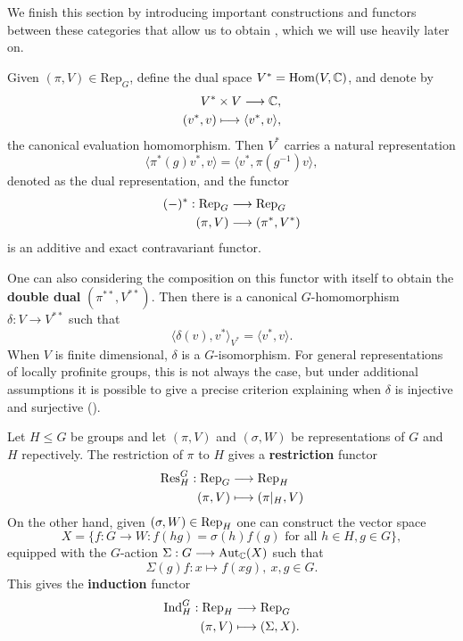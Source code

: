 We finish this section by introducing important constructions and functors between these categories that allow us to obtain , which we will use heavily later on.

\begin{defn}
    Given $(\pi,V)\in\mathrm{Rep}_G$, define the dual space $V^*=\mathrm{Hom}(V,\mathbb{C})$, and denote by 
    \begin{align*}
        V^*\times V\longrightarrow \mathbb{C},\\
        (v^*,v)\longmapsto\langle v^*,v\rangle,
    \end{align*}
    the canonical evaluation homomorphism. Then $V^*$ carries a natural representation 
    $$\langle\pi^*(g)v^*,v\rangle=\langle v^*,\pi(g^{-1})v\rangle,$$
    denoted as the dual representation, and the functor 
    \begin{align*}
        (-)^*:\mathrm{Rep}_G&\longrightarrow\mathrm{Rep}_G\\
        (\pi,V)&\longrightarrow(\pi^*,V^*)
    \end{align*}
    is an additive and exact contravariant functor.
\end{defn}

One can also considering the composition on this functor with itself to obtain the \textbf{double dual} $(\pi^{**},V^{**})$. Then there is a canonical $G$-homomorphism $\delta:V\rightarrow V^{**}$ such that $$\langle\delta(v),v^*\rangle_{V^*}=\langle v^*,v\rangle.$$
When $V$ is finite dimensional, $\delta$ is a $G$-isomorphism. For general representations of locally profinite groups, this is not always the case, but under additional assumptions it is possible to give a precise criterion explaining when $\delta$ is injective and surjective (\cite[2.8 Corollary, 2.9 Proposition]{BH1}).


\begin{defn}
    Let $H\leq G$ be groups and let $(\pi,V)$ and $(\sigma,W)$ be representations of $G$ and $H$ repectively. The restriction of $\pi$ to $H$ gives a \textbf{restriction} functor
    \begin{align*}
        \mathrm{Res}_H^G:\mathrm{Rep}_G&\longrightarrow\mathrm{Rep}_H\\
        (\pi,V)&\longmapsto(\pi|_H,V)
    \end{align*}
    On the other hand, given $(\sigma,W)\in\mathrm{Rep}_H$ one can construct the vector space
    $$X=\{f:G\to W:f(hg)=\sigma(h)f(g)\text{ for all }h\in H, g\in G\},$$
    equipped with the $G$-action $\Sigma:G\longrightarrow\mathrm{Aut}_{\mathbb{C}}(X)$ such that
    $$\Sigma(g)f:x\longmapsto f(xg),\ x,g\in G.$$
    This gives the \textbf{induction} functor
    \begin{align*}
        \mathrm{Ind}_H^G:\mathrm{Rep}_H&\longrightarrow\mathrm{Rep}_G\\
        (\pi,V)&\longmapsto(\Sigma,X).
    \end{align*}
\end{defn}

